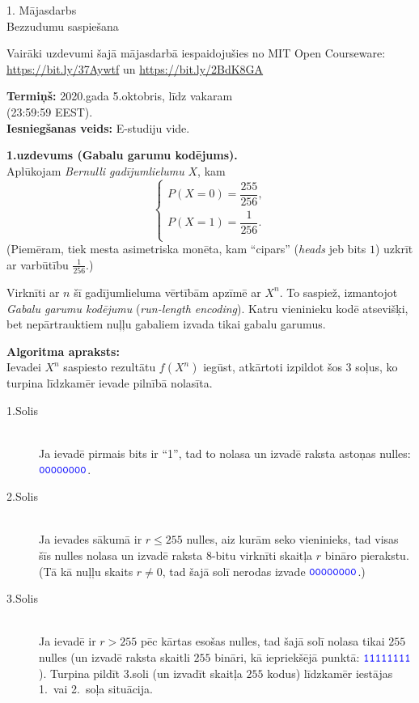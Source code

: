 \documentclass[a4paper]{article}
\begin{document}
\twocolumn


\begin{center}
{\Large 1. Mājasdarbs}\\
{\Large Bezzudumu saspiešana}
\end{center}


{\footnotesize
Vairāki uzdevumi šajā mājasdarbā iespaidojušies no MIT Open Courseware:
\url{https://bit.ly/37Aywtf} un \url{https://bit.ly/2BdK8GA}\\
}

{\bf Termiņš:} 2020.gada 5.oktobris, līdz vakaram\\ (23:59:59 EEST).\\
{\bf Iesniegšanas veids:} E-studiju vide.

\vspace{10pt}
{\bf 1.uzdevums (Gabalu garumu kodējums).}\\
Aplūkojam {\em Bernulli gadījumlielumu} $X$, kam
$$\left\{
\begin{array}{l}
P(X = 0) = \dfrac{255}{256},\\[6pt]
P(X = 1) = \dfrac{1}{256}.\\
\end{array} \right.$$
(Piemēram, tiek mesta asi\-met\-ris\-ka monēta, kam ``cipars''
({\em heads} jeb bits $1$) uzkrīt ar varbūtību $\frac{1}{256}$.)

Virknīti ar $n$ šī gadījumlieluma vērtībām ap\-zī\-mē ar $X^n$.
To saspiež, izmantojot {\em Gabalu garumu ko\-dē\-ju\-mu} ({\em run-length encoding}).
Katru vieninieku kodē atsevišķi, bet
nepārtrauktiem nuļļu gabaliem izvada tikai gabalu garumus.

{\bf Algoritma apraksts:}\\
Ievadei $X^n$ saspiesto rezultātu $f(X^n)$ iegūst,
atkārtoti izpildot šos 3 soļus, ko turpina līdzkamēr
ievade pilnībā nolasīta.

\begin{description}
\item[1.Solis] \hfill \\
Ja ievadē pirmais bits ir ``1'', tad to nolasa un
izvadē raksta astoņas nulles:
$\textcolor{blue}{\mathtt{00000000}}$.
\item[2.Solis] \hfill \\
Ja ievades sākumā ir $r \leq 255$ nulles, aiz kurām seko vieninieks,
tad visas šīs nulles nolasa un
izvadē raksta $8$-bitu virknīti \textendash{} skaitļa $r$ bināro pierakstu.
(Tā kā nuļļu skaits $r \neq 0$, tad šajā solī nerodas izvade $\textcolor{blue}{\mathtt{00000000}}$.)
\item[3.Solis] \hfill \\
Ja ievadē ir $r > 255$ pēc kārtas esošas nulles,
tad šajā solī nolasa tikai $255$ nulles (un izvadē raksta skaitli $255$ bināri, kā iepriekšējā punktā:
$\textcolor{blue}{\mathtt{11111111}}$). Turpina pildīt 3.soli (un izvadīt skaitļa
$255$ kodus) līdzkamēr iestājas 1.\ vai 2.\ soļa situācija.
\end{description}
\end{document}
